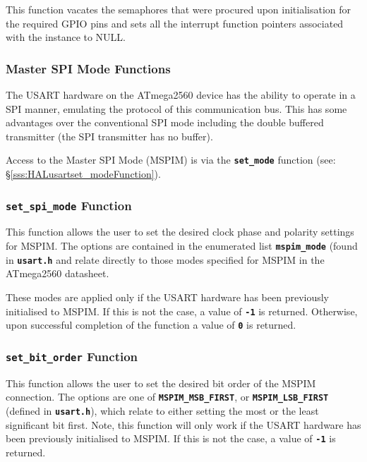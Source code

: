 \documentclass[a4paper, oneside, 11pt, titlepage, onecolumn, openright]{article}
\begin{document}
			This function vacates the semaphores that were procured upon initialisation for the required GPIO pins and sets all the interrupt function pointers associated with the instance to NULL.

\subsubsection{Master SPI Mode Functions}
			\label{sss:HALusartMasterSPIModeFunctions}
			
			The USART hardware on the ATmega2560 device has the ability to operate in a SPI manner, emulating the protocol of this communication bus. This has some advantages over the conventional SPI mode including the double buffered transmitter (the SPI transmitter has no buffer).
			
			Access to the Master SPI Mode (MSPIM) is via the \textbf{\texttt{set\_mode}} function (see: \S\ref{sss:HALusartset_modeFunction}).
			
\subsubsection{\textbf{\texttt{set\_spi\_mode}} Function}
			\label{sss:HALusartMasterSPIModeset_spi_modeFunctions}
			
			This function allows the user to set the desired clock phase and polarity settings for MSPIM. The options are contained in the enumerated list \textbf{\texttt{mspim\_mode}} (found in \textbf{\texttt{usart.h}} and relate directly to those modes specified for MSPIM in the ATmega2560 datasheet.
			
			These modes are applied only if the USART hardware has been previously initialised to MSPIM. If this is not the case, a value of \textbf{\texttt{-1}} is returned. Otherwise, upon successful completion of the function a value of \textbf{\texttt{0}} is returned.
			
\subsubsection{\textbf{\texttt{set\_bit\_order}} Function}
			\label{sss:HALusartMasterSPIModeset_bit_orderFunctions}
			
			This function allows the user to set the desired bit order of the MSPIM connection. The options are one of \textbf{\texttt{MSPIM\_MSB\_FIRST}}, or \textbf{\texttt{MSPIM\_LSB\_FIRST}} (defined in \textbf{\texttt{usart.h}}), which relate to either setting the most or the least significant bit first. Note, this function will only work if the USART hardware has been previously initialised to MSPIM. If this is not the case, a value of \textbf{\texttt{-1}} is returned. 
			
\end{document}
